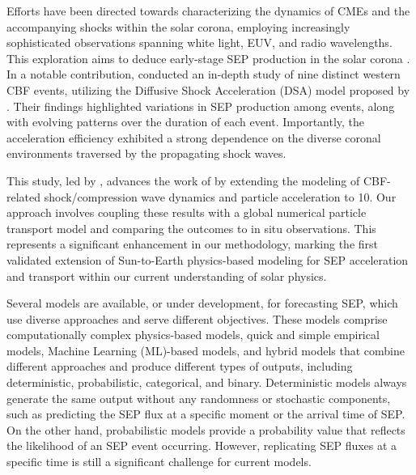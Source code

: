 Efforts have been directed towards characterizing the dynamics of CMEs and the accompanying shocks within the solar corona, employing increasingly sophisticated observations spanning white light, EUV, and radio wavelengths. This exploration aims to deduce early-stage SEP production in the solar corona \citep{kozarev_2013, schwadron_2015}. In a notable contribution, \citet{kozarev_2019} conducted an in-depth study of nine distinct western CBF events, utilizing the Diffusive Shock Acceleration (DSA) model proposed by \citet{kozarev_2016}. Their findings highlighted variations in SEP production among events, along with evolving patterns over the duration of each event. Importantly, the acceleration efficiency exhibited a strong dependence on the diverse coronal environments traversed by the propagating shock waves.

This study, led by \citet{kozarev_2022}, advances the work of \citet{kozarev_2019} by extending the modeling of CBF-related shock/compression wave dynamics and particle acceleration to 10\rsun. Our approach involves coupling these results with a global numerical particle transport model and comparing the outcomes to in situ observations. This represents a significant enhancement in our methodology, marking the first validated extension of Sun-to-Earth physics-based modeling for SEP acceleration and transport within our current understanding of solar physics.








Several models are available, or under development, for forecasting SEP, which use diverse approaches and serve different objectives. These models comprise computationally complex physics-based models, quick and simple empirical models, Machine Learning (ML)-based models, and hybrid models that combine different approaches and produce different types of outputs, including deterministic, probabilistic, categorical, and binary. Deterministic models always generate the same output without any randomness or stochastic components, such as predicting the SEP flux at a specific moment or the arrival time of SEP. On the other hand, probabilistic models provide a probability value that reflects the likelihood of an SEP event occurring. However, replicating SEP fluxes at a specific time is still a significant challenge for current models.

